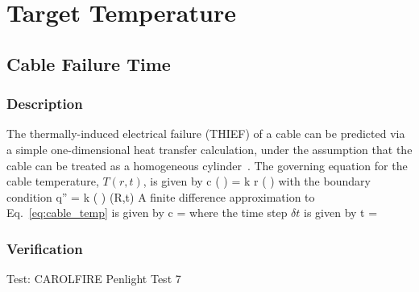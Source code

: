 
\chapter{Target Temperature}
\label{Target_Temperature_Chapter}

\section{Cable Failure Time}

\subsection*{Description}

The thermally-induced electrical failure (THIEF) of a cable can be predicted via a simple
one-dimensional heat transfer calculation, under the assumption that the cable can be
treated as a homogeneous cylinder~\cite{CAROLFIRE}. The governing equation for the cable temperature,
$T(r,t)$, is given by
\be
\rho c \left(  \right) =   k r \left(  \right)
\label{eq:cable_temp}
\ee
with the boundary condition
\be
\dot q'' = k \left(  \right) (R,t)
\ee
A finite difference approximation to Eq.~\ref{eq:cable_temp} is given by
\be
\rho c  =   
\ee
where the time step $\delta t$ is given by
\be
\delta t = 
\ee


\clearpage


\subsection*{Verification}

Test: CAROLFIRE Penlight Test 7

